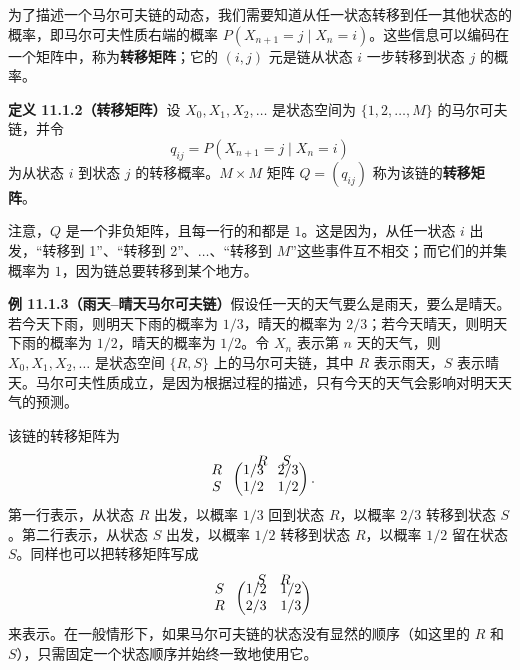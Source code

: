 \documentclass[UTF8, 12pt, fontset=fandol, oneside]{ctexart}
\begin{document}
为了描述一个马尔可夫链的动态，我们需要知道从任一状态转移到任一其他状态的概率，即马尔可夫性质右端的概率 $P(X_{n+1}=j\mid X_n=i)$。这些信息可以编码在一个矩阵中，称为\textbf{转移矩阵}；它的 $(i,j)$ 元是链从状态 $i$ 一步转移到状态 $j$ 的概率。

\noindent\textbf{定义 11.1.2（转移矩阵）}\quad 设 $X_0,X_1,X_2,\ldots$ 是状态空间为 $\{1,2,\ldots,M\}$ 的马尔可夫链，并令
\[
  q_{ij}=P(X_{n+1}=j\mid X_n=i)
\]
为从状态 $i$ 到状态 $j$ 的转移概率。$M\times M$ 矩阵 $Q=(q_{ij})$ 称为该链的\textbf{转移矩阵}。

注意，$Q$ 是一个非负矩阵，且每一行的和都是 $1$。这是因为，从任一状态 $i$ 出发，“转移到 1”、“转移到 2”、$\ldots$、“转移到 $M$”这些事件互不相交；而它们的并集概率为 $1$，因为链总要转移到某个地方。

\noindent\textbf{例 11.1.3（雨天--晴天马尔可夫链）}\quad 假设任一天的天气要么是雨天，要么是晴天。若今天下雨，则明天下雨的概率为 $1/3$，晴天的概率为 $2/3$；若今天晴天，则明天下雨的概率为 $1/2$，晴天的概率为 $1/2$。令 $X_n$ 表示第 $n$ 天的天气，则 $X_0,X_1,X_2,\ldots$ 是状态空间 $\{R,S\}$ 上的马尔可夫链，其中 $R$ 表示雨天，$S$ 表示晴天。马尔可夫性质成立，是因为根据过程的描述，只有今天的天气会影响对明天天气的预测。

该链的转移矩阵为
\[
\begin{array}{c@{\;}c}
 & \begin{array}{cc} R & S \end{array}\\[-2mm]
\begin{array}{c} R\\ S \end{array}
&
\begin{pmatrix}
  1/3 & 2/3\\
  1/2 & 1/2
\end{pmatrix}.
\end{array}
\]
第一行表示，从状态 $R$ 出发，以概率 $1/3$ 回到状态 $R$，以概率 $2/3$ 转移到状态 $S$。第二行表示，从状态 $S$ 出发，以概率 $1/2$ 转移到状态 $R$，以概率 $1/2$ 留在状态 $S$。同样也可以把转移矩阵写成
\[
\begin{array}{c@{\;}c}
 & \begin{array}{cc} S & R \end{array}\\[-2mm]
\begin{array}{c} S\\ R \end{array}
&
\begin{pmatrix}
  1/2 & 1/2\\
  2/3 & 1/3
\end{pmatrix}
\end{array}
\]
来表示。在一般情形下，如果马尔可夫链的状态没有显然的顺序（如这里的 $R$ 和 $S$），只需固定一个状态顺序并始终一致地使用它。
\end{document}
